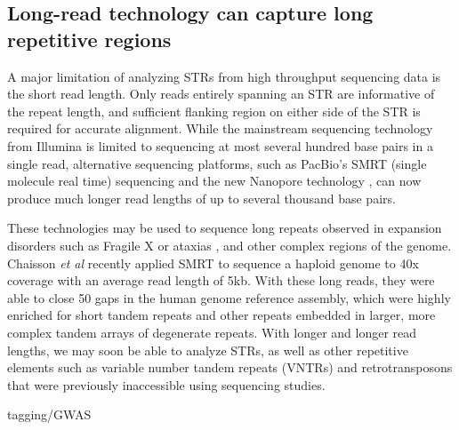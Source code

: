 \subsection{Long-read technology can capture long repetitive regions}
A major limitation of analyzing STRs from high throughput sequencing data is the short read length. Only reads entirely spanning an STR are informative of the repeat length, and sufficient flanking region on either side of the STR is required for accurate alignment. While the mainstream sequencing technology from Illumina is limited to sequencing at most several hundred base pairs in a single read, alternative sequencing platforms, such as PacBio's SMRT (single molecule real time) sequencing \cite{EidFehrGrayEtAl2009} and the new Nanopore technology \cite{ClarkeWuJayasingheEtAl2009}, can now produce much longer read lengths of up to several thousand base pairs.

These technologies may be used to sequence long repeats observed in expansion disorders such as Fragile X \cite{LoomisEidPelusoEtAl2012} or ataxias \cite{DoiMonjoHoangEtAl2013}, and other complex regions of the genome. Chaisson \emph{et al} \cite{ChaissonHuddlestonDennisEtAl2015} recently applied SMRT to sequence a haploid genome to 40x coverage with an average read length of 5kb. With these long reads, they were able to close 50 gaps in the human genome reference assembly, which were highly enriched for short tandem repeats and other repeats embedded in larger, more complex tandem arrays of degenerate repeats. With longer and longer read lengths, we may soon be able to analyze STRs, as well as other repetitive elements such as variable number tandem repeats (VNTRs) and retrotransposons that were previously inaccessible using sequencing studies.




tagging/GWAS